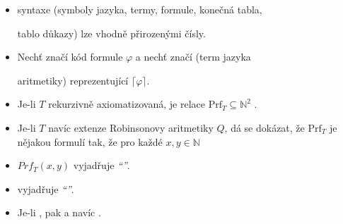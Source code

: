     \begin{itemize}
    \item {} syntaxe (symboly jazyka, termy, formule, konečná tabla,
    \smallskip
    
    tablo důkazy) lze vhodně  přirozenými čísly.
    \smallskip
    
    \item Nechť \mdef{$\lceil \varphi \rceil$} značí kód formule $\varphi$ a nechť \mdef{$\underline{\varphi}$} značí  (term jazyka
    \smallskip
    
    aritmetiky) reprezentující $\lceil \varphi \rceil$.
    \smallskip
    
    \item Je-li $T$ rekurzivně axiomatizovaná, je relace $\mathrm{Prf}_T\subseteq \mathbb{N}^2$ .

    

    \item Je-li $T$ navíc extenze Robinsonovy aritmetiky $Q$, dá se dokázat, že $\mathrm{Prf}_T$ je    
     nějakou formulí  tak, že pro každé $x,y\in \mathbb{N}$

    
    \item $Prf_T(x,y)$ vyjadřuje {\it ``''}.
    \smallskip
    
    \item {} vyjadřuje {\it ``''}.
    \smallskip
    
    \item Je-li , pak  a navíc .
    \end{itemize}
    
    
    
